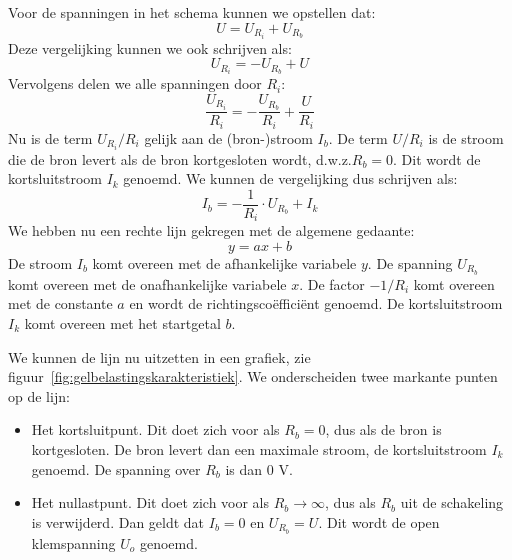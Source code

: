 Voor de spanningen in het schema kunnen we opstellen dat:
%
\begin{equation}
U = U_{R_i} + U_{R_b}
\end{equation}
%
Deze vergelijking kunnen we ook schrijven als:
\begin{equation}
U_{R_i} = - U_{R_b} + U
\end{equation}
%
Vervolgens delen we alle spanningen door $R_i$:
%
\begin{equation}
\dfrac{U_{R_i}}{R_i} = - \dfrac{U_{R_b}}{R_i} + \dfrac{U}{R_i}
\end{equation}
%
Nu is de term $U_{R_i}/R_i$ gelijk aan de (bron-)stroom $I_b$. De term $U/R_i$ is de stroom die de bron levert
als de bron kortgesloten wordt, d.w.z.\@ $R_b=0$. Dit wordt de kortsluitstroom $I_k$ genoemd. We kunnen de
vergelijking dus schrijven als:
%
\begin{equation}
\label{equ:gelbelastingsfunctie}
I_b = -\dfrac{1}{R_i}\cdot U_{R_b} + I_k
\end{equation}
%
We hebben nu een rechte lijn gekregen met de algemene gedaante:
%
\begin{equation}
y=ax+b
\end{equation}
%
De stroom $I_b$ komt overeen met de afhankelijke variabele $y$. De spanning $U_{R_b}$ komt overeen met de
onafhankelijke variabele $x$. De factor $-1/R_i$ komt overeen met de constante $a$ en wordt de
richtingsco\"effici\"ent genoemd. De kortsluitstroom $I_k$ komt overeen met het startgetal $b$.

We kunnen de lijn nu uitzetten in een grafiek, zie figuur~\ref{fig:gelbelastingskarakteristiek}.
We onderscheiden twee markante punten op de lijn:

\begin{itemize}
\item Het kortsluitpunt. Dit doet zich voor als $R_b=0$, dus als de bron is kortgesloten. De bron
      levert dan een maximale stroom, de kortsluitstroom $I_k$ genoemd. De spanning over $R_b$ is
      dan 0 V.
\item Het nullastpunt. Dit doet zich voor als $R_b \rightarrow \infty$, dus als $R_b$ uit de schakeling
      is verwijderd. Dan geldt dat $I_b=0$ en $U_{R_b}=U$. Dit wordt de open klemspanning $U_o$ genoemd. 
\end{itemize}

